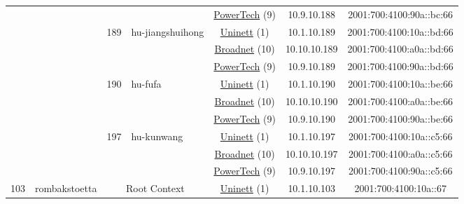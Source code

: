 \begin{small}
\begin{center}
\begin{longtable}{|c|c|c|c|c|c|c|c|}
  &  &  &  & \multicolumn{2}{|c|}{\tiny{\href{http://www.powertech.no}{PowerTech} (9)}} & \tiny{10.9.10.188} & \tiny{2001:700:4100:90a::bc:66} \\* \cline{3-3}\cline{4-4}\cline{5-5}\cline{6-6}\cline{7-7}\cline{8-8}
  &  & \multirow{3}{*}{\tiny{189}} & \multicolumn{1}{|l|}{\multirow{3}{*}{\tiny{hu-jiangshuihong}}} & \multicolumn{2}{|c|}{\tiny{\href{https://www.uninett.no}{Uninett} (1)}} & \tiny{10.1.10.189} & \tiny{2001:700:4100:10a::bd:66} \\* \cline{5-5}\cline{6-6}\cline{7-7}\cline{8-8}
  &  &  &  & \multicolumn{2}{|c|}{\tiny{\href{https://www.broadnet.no}{Broadnet} (10)}} & \tiny{10.10.10.189} & \tiny{2001:700:4100:a0a::bd:66} \\* \cline{5-5}\cline{6-6}\cline{7-7}\cline{8-8}
  &  &  &  & \multicolumn{2}{|c|}{\tiny{\href{http://www.powertech.no}{PowerTech} (9)}} & \tiny{10.9.10.189} & \tiny{2001:700:4100:90a::bd:66} \\* \cline{3-3}\cline{4-4}\cline{5-5}\cline{6-6}\cline{7-7}\cline{8-8}
  &  & \multirow{3}{*}{\tiny{190}} & \multicolumn{1}{|l|}{\multirow{3}{*}{\tiny{hu-fufa}}} & \multicolumn{2}{|c|}{\tiny{\href{https://www.uninett.no}{Uninett} (1)}} & \tiny{10.1.10.190} & \tiny{2001:700:4100:10a::be:66} \\* \cline{5-5}\cline{6-6}\cline{7-7}\cline{8-8}
  &  &  &  & \multicolumn{2}{|c|}{\tiny{\href{https://www.broadnet.no}{Broadnet} (10)}} & \tiny{10.10.10.190} & \tiny{2001:700:4100:a0a::be:66} \\* \cline{5-5}\cline{6-6}\cline{7-7}\cline{8-8}
  &  &  &  & \multicolumn{2}{|c|}{\tiny{\href{http://www.powertech.no}{PowerTech} (9)}} & \tiny{10.9.10.190} & \tiny{2001:700:4100:90a::be:66} \\* \cline{3-3}\cline{4-4}\cline{5-5}\cline{6-6}\cline{7-7}\cline{8-8}
  &  & \multirow{3}{*}{\tiny{197}} & \multicolumn{1}{|l|}{\multirow{3}{*}{\tiny{hu-kunwang}}} & \multicolumn{2}{|c|}{\tiny{\href{https://www.uninett.no}{Uninett} (1)}} & \tiny{10.1.10.197} & \tiny{2001:700:4100:10a::c5:66} \\* \cline{5-5}\cline{6-6}\cline{7-7}\cline{8-8}
  &  &  &  & \multicolumn{2}{|c|}{\tiny{\href{https://www.broadnet.no}{Broadnet} (10)}} & \tiny{10.10.10.197} & \tiny{2001:700:4100:a0a::c5:66} \\* \cline{5-5}\cline{6-6}\cline{7-7}\cline{8-8}
  &  &  &  & \multicolumn{2}{|c|}{\tiny{\href{http://www.powertech.no}{PowerTech} (9)}} & \tiny{10.9.10.197} & \tiny{2001:700:4100:90a::c5:66} \\ \hline
 \multirow{60}{*}{\tiny{103}} & \multicolumn{1}{|l|}{\multirow{60}{*}{\tiny{rombakstoetta}}} & \multicolumn{2}{|c|}{\multirow{3}{*}{\tiny{Root Context}}} & \multicolumn{2}{|c|}{\tiny{\href{https://www.uninett.no}{Uninett} (1)}} & \tiny{10.1.10.103} & \tiny{2001:700:4100:10a::67} \\* \cline{5-5}\cline{6-6}\cline{7-7}\cline{8-8}

\end{longtable}
\end{center}
\end{small}
